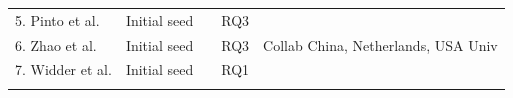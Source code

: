 \documentclass[]{book}
\begin{document}
\begin{longtable}[]{@{}lllll@{}}
\begin{minipage}[t]{0.18\columnwidth}
5. Pinto et al.\strut
\end{minipage} & \begin{minipage}[t]{0.17\columnwidth}\raggedright\strut
Initial seed\strut
\end{minipage} & \begin{minipage}[t]{0.26\columnwidth}\raggedright\strut
\citet{pinto2018work}\strut
\end{minipage} & \begin{minipage}[t]{0.05\columnwidth}\raggedright\strut
RQ3\strut
\end{minipage} & \begin{minipage}[t]{0.19\columnwidth}\raggedright\strut
\strut
\end{minipage}\tabularnewline
\begin{minipage}[t]{0.18\columnwidth}\raggedright\strut
6. Zhao et al.\strut
\end{minipage} & \begin{minipage}[t]{0.17\columnwidth}\raggedright\strut
Initial seed\strut
\end{minipage} & \begin{minipage}[t]{0.26\columnwidth}\raggedright\strut
\citet{zhao2017impact}\strut
\end{minipage} & \begin{minipage}[t]{0.05\columnwidth}\raggedright\strut
RQ3\strut
\end{minipage} & \begin{minipage}[t]{0.19\columnwidth}\raggedright\strut
Collab China, Netherlands, USA Univ\strut
\end{minipage}\tabularnewline
\begin{minipage}[t]{0.18\columnwidth}\raggedright\strut
7. Widder et al.\strut
\end{minipage} & \begin{minipage}[t]{0.17\columnwidth}\raggedright\strut
Initial seed\strut
\end{minipage} & \begin{minipage}[t]{0.26\columnwidth}\raggedright\strut
\citet{widder2018m}\strut
\end{minipage} & \begin{minipage}[t]{0.05\columnwidth}\raggedright\strut
RQ1\strut
\end{minipage} & \begin{minipage}[t]{0.19\columnwidth}\raggedright\strut
\strut
\end{minipage}\tabularnewline
\begin{minipage}[t]{0.18\columnwidth}\raggedright\strut

\end{minipage}
\end{longtable}
\end{document}
